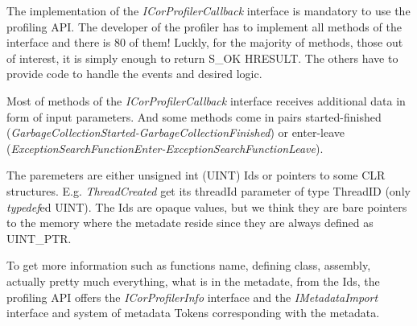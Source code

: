 The implementation of the \textit{ICorProfilerCallback} interface is mandatory to use the profiling API. The developer of the profiler has to implement all methods of the interface and there is 80 of them! Luckly, for the majority of methods, those out of interest, it is simply enough to return S_OK HRESULT. The others have to provide code to handle the events and desired logic.

Most of methods of the \textit{ICorProfilerCallback} interface receives additional data in form of input parameters. And some methods come in pairs started-finished (\textit{GarbageCollectionStarted-GarbageCollectionFinished}) or enter-leave (\textit{ExceptionSearchFunctionEnter-ExceptionSearchFunctionLeave}). 

The paremeters are either unsigned int (UINT) Ids or pointers to some CLR structures. E.g. \textit{ThreadCreated} get its threadId parameter of type ThreadID (only \textit{typedef}ed UINT). The Ids are opaque values, but we think they are bare pointers to the memory where the metadate reside since they are always defined as UINT_PTR.

To get more information such as functions name, defining class, assembly, actually pretty much everything, what is in the metadate, from the Ids, the profiling API offers the \textit{ICorProfilerInfo} interface and the \textit{IMetadataImport} interface and system of metadata Tokens corresponding with the metadata.

